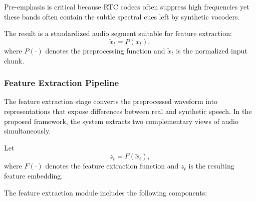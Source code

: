 Pre-emphasis is critical because RTC codecs often suppress high frequencies yet these bands often contain the subtle spectral cues left by synthetic vocoders. 

The result is a standardized audio segment suitable for feature extraction:
\begin{equation}
\tilde{x}_t = P(x_t),
\end{equation}
where \(P(\cdot)\) denotes the preprocessing function and \(\tilde{x}_t\) is the normalized input chunk.

\subsubsection{Feature Extraction Pipeline}

The feature extraction stage converts the preprocessed waveform into representations that expose differences between real and synthetic speech. In the proposed framework, the system extracts two complementary views of audio simultaneously.

Let
\begin{equation}
z_t = F(\tilde{x}_t),
\end{equation}
where \(F(\cdot)\) denotes the feature extraction function and \(z_t\) is the resulting feature embedding.

The feature extraction module includes the following components:

